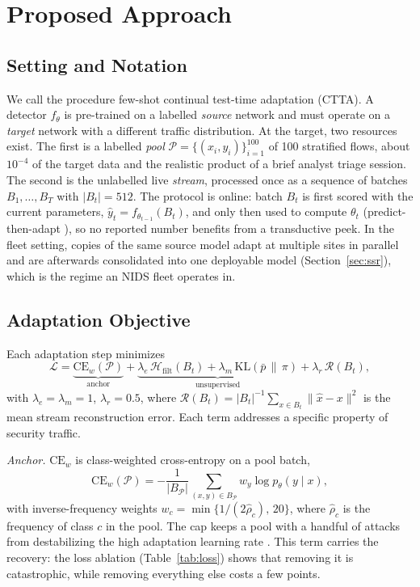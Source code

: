 \documentclass[10pt, conference, letterpaper]{IEEEtran}
\begin{document}
\section{Proposed Approach}
\label{sec:approach}

\subsection{Setting and Notation}\label{sec:setting}
We call the procedure few-shot continual test-time adaptation (CTTA).
A detector $f_\theta$ is pre-trained on a labelled \emph{source}
network and must operate on a \emph{target} network with a different
traffic distribution. At the target, two resources exist. The first is
a labelled \emph{pool} $\mathcal{P}=\{(x_i,y_i)\}_{i=1}^{100}$ of 100
stratified flows, about $10^{-4}$ of the target data and the realistic
product of a brief analyst triage session. The second is the
unlabelled live \emph{stream}, processed once as a sequence of batches
$B_1,\dots,B_T$ with $|B_t|=512$. The protocol is online: batch $B_t$
is first scored with the current parameters,
$\hat{y}_t=f_{\theta_{t-1}}(B_t)$, and only then used to compute
$\theta_t$ (predict-then-adapt \cite{wang2021tent}), so no reported
number benefits from a transductive peek. In the fleet setting, copies
of the same source model adapt at multiple sites in parallel and are
afterwards consolidated into one deployable model
(Section~\ref{sec:ssr}), which is the regime an NIDS fleet operates
in.

\subsection{Adaptation Objective}\label{sec:objective}
Each adaptation step minimizes
\begin{equation}
\mathcal{L} = \underbrace{\mathrm{CE}_w(\mathcal{P})}_{\text{anchor}}
 + \underbrace{\lambda_e\, \mathcal{H}_{\text{filt}}(B_t)
 + \lambda_m\, \mathrm{KL}(\bar{p}\,\|\,\pi)}_{\text{unsupervised}}
 + \lambda_r\, \mathcal{R}(B_t),
\label{eq:loss}
\end{equation}
with $\lambda_e{=}\lambda_m{=}1$, $\lambda_r{=}0.5$, where
$\mathcal{R}(B_t)=|B_t|^{-1}\sum_{x\in B_t}\|\hat{x}-x\|^2$ is the
mean stream reconstruction error. Each term addresses a specific
property of security traffic.

\emph{Anchor.} $\mathrm{CE}_w$ is class-weighted cross-entropy on a
pool batch,
\begin{equation}
\mathrm{CE}_w(\mathcal{P}) = -\frac{1}{|B_{\mathcal{P}}|}
\sum_{(x,y)\in B_{\mathcal{P}}} w_y \log p_\theta(y \mid x),
\label{eq:ce}
\end{equation}
with inverse-frequency weights
$w_c = \min\{1/(2\hat{\rho}_c),\, 20\}$, where $\hat{\rho}_c$ is the
frequency of class $c$ in the pool. The cap keeps a pool with a
handful of attacks from destabilizing the high adaptation learning
rate \cite{lin2017focal}. This term carries the
recovery: the loss ablation (Table~\ref{tab:loss}) shows that removing
it is catastrophic, while removing everything else costs a few points.
\end{document}
